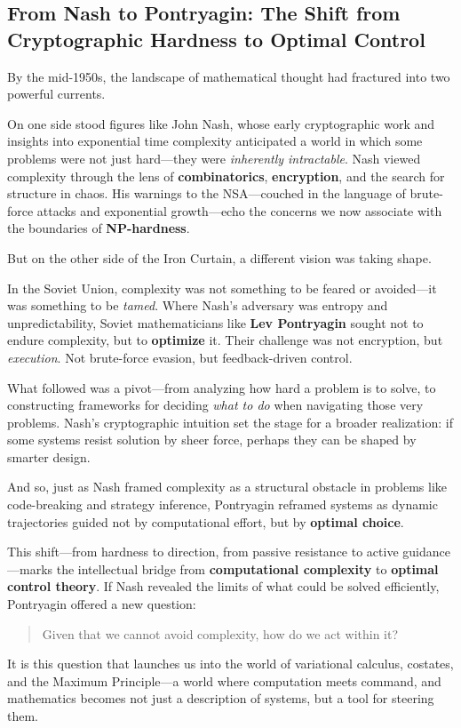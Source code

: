 \subsection{From Nash to Pontryagin: The Shift from Cryptographic Hardness to Optimal Control}

By the mid-1950s, the landscape of mathematical thought had fractured into two powerful currents.

On one side stood figures like John Nash, whose early cryptographic work and insights into exponential time complexity anticipated a world in which some problems were not just hard—they were \emph{inherently intractable}. Nash viewed complexity through the lens of \textbf{combinatorics}, \textbf{encryption}, and the search for structure in chaos. His warnings to the NSA—couched in the language of brute-force attacks and exponential growth—echo the concerns we now associate with the boundaries of \textbf{NP-hardness}.

But on the other side of the Iron Curtain, a different vision was taking shape.

In the Soviet Union, complexity was not something to be feared or avoided—it was something to be \emph{tamed}. Where Nash’s adversary was entropy and unpredictability, Soviet mathematicians like \textbf{Lev Pontryagin} sought not to endure complexity, but to \textbf{optimize} it. Their challenge was not encryption, but \textit{execution}. Not brute-force evasion, but feedback-driven control.

What followed was a pivot—from analyzing how hard a problem is to solve, to constructing frameworks for deciding \textit{what to do} when navigating those very problems. Nash’s cryptographic intuition set the stage for a broader realization: if some systems resist solution by sheer force, perhaps they can be shaped by smarter design.

And so, just as Nash framed complexity as a structural obstacle in problems like code-breaking and strategy inference, Pontryagin reframed systems as dynamic trajectories guided not by computational effort, but by \textbf{optimal choice}.

This shift—from hardness to direction, from passive resistance to active guidance—marks the intellectual bridge from \textbf{computational complexity} to \textbf{optimal control theory}. If Nash revealed the limits of what could be solved efficiently, Pontryagin offered a new question:

\begin{quote}
Given that we cannot avoid complexity, how do we act within it?
\end{quote}

It is this question that launches us into the world of variational calculus, costates, and the Maximum Principle—a world where computation meets command, and mathematics becomes not just a description of systems, but a tool for steering them.
